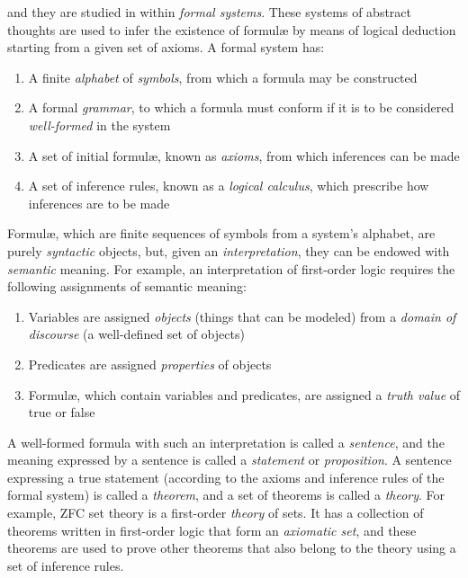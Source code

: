


and they are studied in within \textit{formal systems}. These systems of abstract thoughts are used to infer the existence of formul{\ae} by means of logical deduction starting from a given set of axioms. A formal system has:

\begin{enumerate}
	\item A finite \textit{alphabet} of \textit{symbols}, from which a formula may be constructed
	\item A formal \textit{grammar}, to which a formula must conform if it is to be considered \textit{well-formed} in the system
	\item A set of initial formul{\ae}, known as \textit{axioms}, from which inferences can be made
	\item A set of inference rules, known as a \textit{logical calculus}, which prescribe how inferences are to be made
\end{enumerate}


Formul{\ae}, which are finite sequences of symbols from a system's alphabet, are purely \textit{syntactic} objects, but, given an \textit{interpretation}, they can be endowed with \textit{semantic} meaning. For example, an interpretation of first-order logic requires the following assignments of semantic meaning:

\begin{enumerate}
	\item Variables are assigned \textit{objects} (things that can be modeled) from a \textit{domain of discourse} (a well-defined set of objects)
	\item Predicates are assigned \textit{properties} of objects
	\item Formul{\ae}, which contain variables and predicates, are assigned a \textit{truth value} of true or false
\end{enumerate}

A well-formed formula with such an interpretation is called a \textit{sentence}, and the meaning expressed by a sentence is called a \textit{statement} or \textit{proposition}. A sentence expressing a true statement (according to the axioms and inference rules of the formal system) is called a \textit{theorem}, and a set of theorems is called a \textit{theory}. For example, ZFC set theory is a first-order \textit{theory} of sets. It has a collection of theorems written in first-order logic that form an \textit{axiomatic set}, and these theorems are used to prove other theorems that also belong to the theory using a set of inference rules. \\

